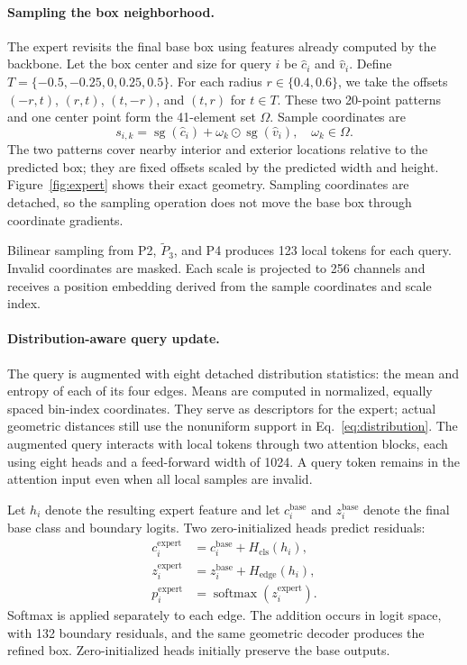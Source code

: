 \paragraph{Sampling the box neighborhood.}
The expert revisits the final base box using features already computed by the backbone. Let the box center and size for query $i$ be $\hat c_i$ and $\hat v_i$. Define $T=\{-0.5,-0.25,0,0.25,0.5\}$. For each radius $r\in\{0.4,0.6\}$, we take the offsets $(-r,t)$, $(r,t)$, $(t,-r)$, and $(t,r)$ for $t\in T$. These two 20-point patterns and one center point form the 41-element set $\Omega$. Sample coordinates are
\begin{equation}
s_{i,k}=\operatorname{sg}(\hat c_i)+
\omega_k\odot\operatorname{sg}(\hat v_i),\quad\omega_k\in\Omega.
\label{eq:sampling}
\end{equation}
The two patterns cover nearby interior and exterior locations relative to the predicted box; they are fixed offsets scaled by the predicted width and height. Figure~\ref{fig:expert} shows their exact geometry. Sampling coordinates are detached, so the sampling operation does not move the base box through coordinate gradients.

Bilinear sampling from P2, $\widetilde P_3$, and P4 produces 123 local tokens for each query. Invalid coordinates are masked. Each scale is projected to 256 channels and receives a position embedding derived from the sample coordinates and scale index.

\paragraph{Distribution-aware query update.}
The query is augmented with eight detached distribution statistics: the mean and entropy of each of its four edges. Means are computed in normalized, equally spaced bin-index coordinates. They serve as descriptors for the expert; actual geometric distances still use the nonuniform support in Eq.~\eqref{eq:distribution}. The augmented query interacts with local tokens through two attention blocks, each using eight heads and a feed-forward width of 1024. A query token remains in the attention input even when all local samples are invalid.

Let $h_i$ denote the resulting expert feature and let $c_i^{\mathrm{base}}$ and $z_i^{\mathrm{base}}$ denote the final base class and boundary logits. Two zero-initialized heads predict residuals:
\begin{equation}
\begin{aligned}
c_i^{\mathrm{expert}}&=c_i^{\mathrm{base}}+H_{\mathrm{cls}}(h_i),\\
z_i^{\mathrm{expert}}&=z_i^{\mathrm{base}}+H_{\mathrm{edge}}(h_i),\\
p_i^{\mathrm{expert}}&=\operatorname{softmax}(z_i^{\mathrm{expert}}).
\end{aligned}
\label{eq:residual}
\end{equation}
Softmax is applied separately to each edge. The addition occurs in logit space, with 132 boundary residuals, and the same geometric decoder produces the refined box. Zero-initialized heads initially preserve the base outputs.

